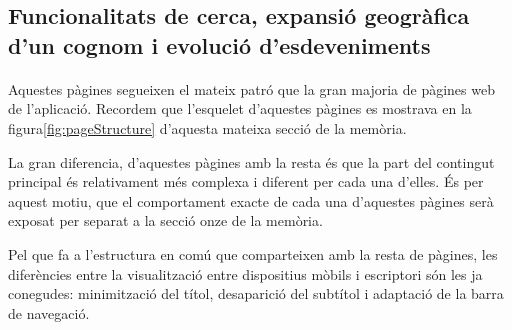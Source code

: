 \subsection{Funcionalitats de cerca, expansió geogràfica d'un cognom i evolució d'esdeveniments}

    \paragraph{}
    Aquestes pàgines segueixen el mateix patró que la gran majoria de pàgines web de l’aplicació. Recordem que l'esquelet d’aquestes pàgines es mostrava en la figura\ref{fig:pageStructure} d'aquesta mateixa secció de la memòria.

    La gran diferencia, d'aquestes pàgines amb la resta és que la part del contingut principal és relativament més complexa i diferent per cada una d'elles. És per aquest motiu, que el comportament exacte de cada una d'aquestes pàgines serà exposat per separat a la secció onze de la memòria.

    Pel que fa a l'estructura en comú que comparteixen amb la resta de pàgines, les diferències entre la visualització entre dispositius mòbils i escriptori són les ja conegudes: minimització del títol, desaparició del subtítol i adaptació de la barra de navegació.
